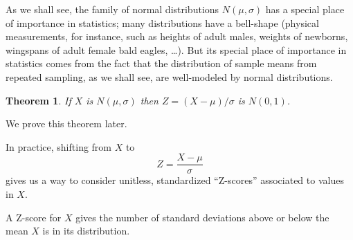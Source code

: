 \documentclass[
]{book}
\newtheorem{theorem}{Theorem}[chapter]
\theoremstyle{definition}
\theoremstyle{definition}
\theoremstyle{definition}
\theoremstyle{definition}
\theoremstyle{remark}
\begin{document}
As we shall see, the family of normal distributions \(N(\mu,\sigma)\) has a special place of importance in statistics; many distributions have a bell-shape (physical measurements, for instance, such as heights of adult males, weights of newborns, wingspans of adult female bald eagles, \ldots). But its special place of importance in statistics comes from the fact that the distribution of sample means from repeated sampling, as we shall see, are well-modeled by normal distributions.

\begin{theorem}
\protect\hypertarget{thm:standardizing-normal-distributions}{}\label{thm:standardizing-normal-distributions}If \(X\) is \(N(\mu,\sigma)\) then \(Z = (X-\mu)/\sigma\) is \(N(0,1)\).
\end{theorem}

We prove this theorem later.

In practice, shifting from \(X\) to \[Z = \frac{X-\mu}{\sigma}\] gives us a way to consider unitless, standardized ``Z-scores'' associated to values in \(X\).

A Z-score for \(X\) gives the number of standard deviations above or below the mean \(X\) is in its distribution.
\end{document}
